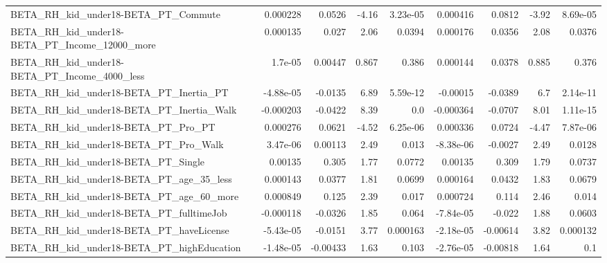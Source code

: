 \begin{tabular}{lrrrrrrrr}
BETA\_RH\_kid\_under18-BETA\_PT\_Commute                &    0.000228 &       0.0526 &    -4.16 & 3.23e-05 &   0.000416 &      0.0812 &        -3.92 &      8.69e-05 \\
BETA\_RH\_kid\_under18-BETA\_PT\_Income\_12000\_more      &    0.000135 &        0.027 &     2.06 &   0.0394 &   0.000176 &      0.0356 &         2.08 &        0.0376 \\
BETA\_RH\_kid\_under18-BETA\_PT\_Income\_4000\_less       &     1.7e-05 &      0.00447 &    0.867 &    0.386 &   0.000144 &      0.0378 &        0.885 &         0.376 \\
BETA\_RH\_kid\_under18-BETA\_PT\_Inertia\_PT             &   -4.88e-05 &      -0.0135 &     6.89 & 5.59e-12 &   -0.00015 &     -0.0389 &          6.7 &      2.14e-11 \\
BETA\_RH\_kid\_under18-BETA\_PT\_Inertia\_Walk           &   -0.000203 &      -0.0422 &     8.39 &      0.0 &  -0.000364 &     -0.0707 &         8.01 &      1.11e-15 \\
BETA\_RH\_kid\_under18-BETA\_PT\_Pro\_PT                 &    0.000276 &       0.0621 &    -4.52 & 6.25e-06 &   0.000336 &      0.0724 &        -4.47 &      7.87e-06 \\
BETA\_RH\_kid\_under18-BETA\_PT\_Pro\_Walk               &    3.47e-06 &      0.00113 &     2.49 &    0.013 &  -8.38e-06 &     -0.0027 &         2.49 &        0.0128 \\
BETA\_RH\_kid\_under18-BETA\_PT\_Single                 &     0.00135 &        0.305 &     1.77 &   0.0772 &    0.00135 &       0.309 &         1.79 &        0.0737 \\
BETA\_RH\_kid\_under18-BETA\_PT\_age\_35\_less            &    0.000143 &       0.0377 &     1.81 &   0.0699 &   0.000164 &      0.0432 &         1.83 &        0.0679 \\
BETA\_RH\_kid\_under18-BETA\_PT\_age\_60\_more            &    0.000849 &        0.125 &     2.39 &    0.017 &   0.000724 &       0.114 &         2.46 &         0.014 \\
BETA\_RH\_kid\_under18-BETA\_PT\_fulltimeJob            &   -0.000118 &      -0.0326 &     1.85 &    0.064 &  -7.84e-05 &      -0.022 &         1.88 &        0.0603 \\
BETA\_RH\_kid\_under18-BETA\_PT\_haveLicense            &   -5.43e-05 &      -0.0151 &     3.77 & 0.000163 &  -2.18e-05 &    -0.00614 &         3.82 &      0.000132 \\
BETA\_RH\_kid\_under18-BETA\_PT\_highEducation          &   -1.48e-05 &     -0.00433 &     1.63 &    0.103 &  -2.76e-05 &    -0.00818 &         1.64 &           0.1 \\

\end{tabular}
